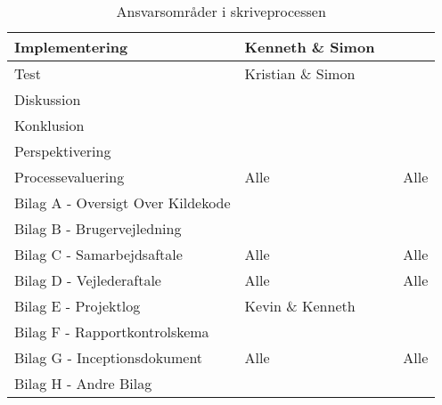 \begin{table}[H]
\begin{tabularx}{\textwidth}{|>{\RaggedRight}p{7cm}|>{\RaggedRight}X|>{\RaggedRight}X|>{\RaggedRight}X|}
        \hline
        Implementering                      & Kenneth \& Simon &  &  \\
        \hline
        Test                                & Kristian \& Simon &  &  \\
        \hline
        Diskussion                          &  &  &  \\
        \hline
        Konklusion                          &  &  &  \\
        \hline
        Perspektivering                     &  &  &  \\
        \hline
        Processevaluering                   & Alle &  & Alle \\
        \hline
        Bilag A - Oversigt Over Kildekode   &  &  &  \\
        \hline
        Bilag B - Brugervejledning          &  &  &  \\
        \hline
        Bilag C - Samarbejdsaftale          & Alle &  & Alle\\
        \hline
        Bilag D - Vejlederaftale            & Alle &  & Alle\\
        \hline
        Bilag E - Projektlog                & Kevin \& Kenneth &  & \\
        \hline
        Bilag F - Rapportkontrolskema       &  &  &  \\
        \hline
        Bilag G - Inceptionsdokument        & Alle &  & Alle \\
        \hline
        Bilag H - Andre Bilag               &  &  &  \\
        \hline
    \end{tabularx}
    \caption{Ansvarsområder i skriveprocessen}
    \label{tab:redaktionelt}
\end{table}